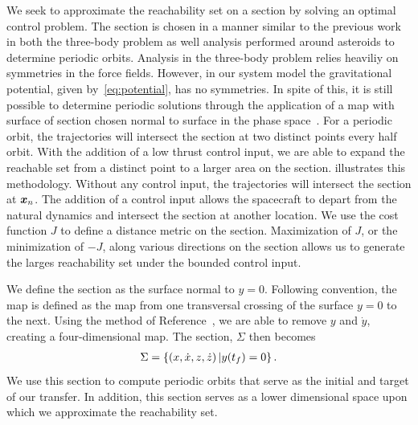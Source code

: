 \documentclass[]{aiaa-tc}%
\begin{document}
We seek to approximate the reachability set on a \Poincare section by solving an optimal control problem.
The \Poincare section is chosen in a manner similar to the previous work in both the three-body problem as well analysis performed around asteroids to determine periodic orbits.
Analysis in the three-body problem relies heaviliy on symmetries in the force fields.
However, in our system model the gravitational potential, given by~\cref{eq:potential}, has no symmetries.
In spite of this, it is still possible to determine periodic solutions through the application of a \Poincare map with surface of section chosen normal to surface in the phase space~\cite{scheeres2000}.
For a periodic orbit, the trajectories will intersect the \Poincare section at two distinct points every half orbit.
With the addition of a low thrust control input, we are able to expand the reachable set from a distinct point to a larger area on the \Poincare section.
 illustrates this methodology.
Without any control input, the trajectories will intersect the \Poincare section at \( \bm{x}_n\).
The addition of a control input allows the spacecraft to depart from the natural dynamics and intersect the section at another location.
We use the cost function \( J \) to define a distance metric on the \Poincare section.
Maximization of \( J \), or the minimization of \( -J \), along various directions on the \Poincare section allows us to generate the larges reachability set under the bounded control input.

We define the \Poincare section as the surface normal to \( y = 0 \).
Following convention, the \Poincare map is defined as the map from one transversal crossing of the surface \( y = 0\) to the next.
Using the method of Reference~\cite{scheeres2000}, we are able to remove \( y \) and \( \dot{y} \), creating a four-dimensional map.
The \Poincare section, \( \Sigma \) then becomes
\begin{align}\label{eq:poincare_section}
    \Sigma = \left\{ \left( x, \dot{x}, z, \dot{z} \right) | y(t_f) = 0  \right\}.
\end{align}
We use this section to compute periodic orbits that serve as the initial and target of our transfer.
In addition, this section serves as a lower dimensional space upon which we approximate the reachability set.
\end{document}
